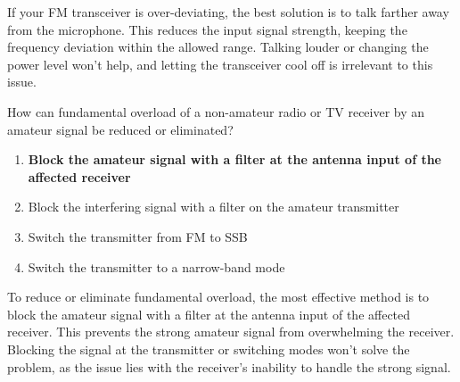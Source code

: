 If your FM transceiver is over-deviating, the best solution is to talk farther away from the microphone. This reduces the input signal strength, keeping the frequency deviation within the allowed range. Talking louder or changing the power level won’t help, and letting the transceiver cool off is irrelevant to this issue.

\begin{tcolorbox}[colback=gray!10!white,colframe=black!75!black,title={T7B05}]
    How can fundamental overload of a non-amateur radio or TV receiver by an amateur signal be reduced or eliminated?
    \begin{enumerate}[label=\Alph*),noitemsep]
        \item \textbf{Block the amateur signal with a filter at the antenna input of the affected receiver}
        \item Block the interfering signal with a filter on the amateur transmitter
        \item Switch the transmitter from FM to SSB
        \item Switch the transmitter to a narrow-band mode
    \end{enumerate}
\end{tcolorbox}

To reduce or eliminate fundamental overload, the most effective method is to block the amateur signal with a filter at the antenna input of the affected receiver. This prevents the strong amateur signal from overwhelming the receiver. Blocking the signal at the transmitter or switching modes won’t solve the problem, as the issue lies with the receiver’s inability to handle the strong signal.
